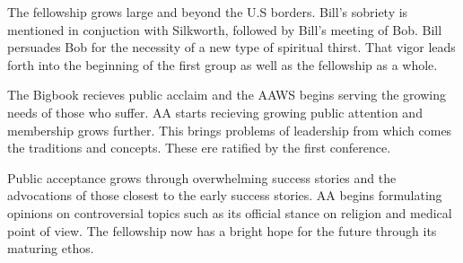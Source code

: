 
\bbChapterPreamble

    The fellowship grows large and beyond the U.S borders. Bill's sobriety is mentioned in conjuction with Silkworth, followed by Bill's meeting of Bob. Bill persuades Bob for the necessity of a new type of spiritual thirst. That vigor leads forth into the beginning of the first group as well as the fellowship as a whole. 

    The Bigbook recieves public acclaim and the AAWS begins serving the growing needs of those who suffer. AA starts recieving growing public attention and membership grows further. This brings problems of leadership from which comes the traditions and concepts. These ere ratified by the first conference.

    Public acceptance grows through overwhelming success stories and the advocations of those closest to the early success stories. AA begins formulating opinions on controversial topics such as its official stance on religion and medical point of view. The fellowship now has a bright hope for the future through its maturing ethos.



